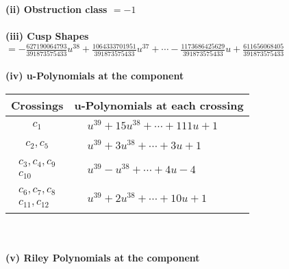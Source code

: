 \documentclass[1p]{elsarticle_modified}
\theoremstyle{definition}
\begin{document}
\flushleft \textbf{(ii) Obstruction class $= -1$}\\~\\
\flushleft \textbf{(iii) Cusp Shapes $= -\frac{627190064793}{391873575433} u^{38}+\frac{1064333701951}{391873575433} u^{37}+\cdots-\frac{1173686425629}{391873575433} u+\frac{611656068405}{391873575433}$}\\~\\
\newpage\renewcommand{\arraystretch}{1}
\flushleft \textbf{(iv) u-Polynomials at the component}\newline \\
\begin{tabular}{m{50pt}|m{274pt}}
Crossings & \hspace{64pt}u-Polynomials at each crossing \\
\hline $$\begin{aligned}c_{1}\end{aligned}$$&$\begin{aligned}
&u^{39}+15 u^{38}+\cdots+111 u+1
\end{aligned}$\\
\hline $$\begin{aligned}c_{2},c_{5}\end{aligned}$$&$\begin{aligned}
&u^{39}+3 u^{38}+\cdots+3 u+1
\end{aligned}$\\
\hline $$\begin{aligned}c_{3},c_{4},c_{9}\\c_{10}\end{aligned}$$&$\begin{aligned}
&u^{39}- u^{38}+\cdots+4 u-4
\end{aligned}$\\
\hline $$\begin{aligned}c_{6},c_{7},c_{8}\\c_{11},c_{12}\end{aligned}$$&$\begin{aligned}
&u^{39}+2 u^{38}+\cdots+10 u+1
\end{aligned}$\\
\hline
\end{tabular}\\~\\
\newpage\renewcommand{\arraystretch}{1}
\flushleft \textbf{(v) Riley Polynomials at the component}\newline \\
\end{document}
